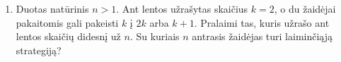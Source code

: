 \begin{enumerate}
%

\item {} Duotas natūrinis $n>1$. Ant lentos užrašytas skaičius $k=2$, o du žaidėjai pakaitomis gali pakeisti $k$ į $2k$ arba $k+1$. Pralaimi tas, kuris užrašo ant lentos skaičių didesnį už $n$. Su kuriais $n$ antrasis žaidėjas turi laiminčiąją strategiją?



\end{enumerate}
